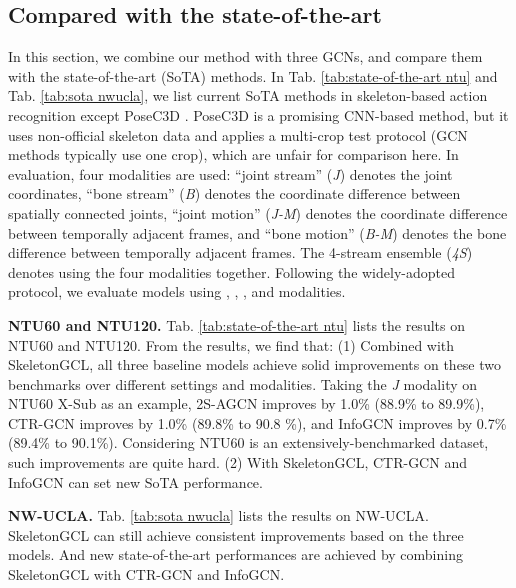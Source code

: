 \documentclass{article} \usepackage{iclr2023_conference,times}
\begin{document}
\subsection{Compared with the state-of-the-art}
In this section, we combine our method with three GCNs, and compare them with the state-of-the-art (SoTA) methods. In Tab. \ref{tab:state-of-the-art ntu} and Tab. \ref{tab:sota nwucla}, we list current SoTA methods in skeleton-based action recognition except PoseC3D \citep{posec3d}. PoseC3D is a promising CNN-based method, but it uses non-official skeleton data and applies a multi-crop test protocol (GCN methods typically use one crop), which are unfair for comparison here. In evaluation, four modalities are used: ``joint stream'' (\textit{J}) denotes the joint coordinates, ``bone stream'' (\textit{B}) denotes the coordinate difference between spatially connected joints, ``joint motion'' (\textit{J-M}) denotes the coordinate difference between temporally adjacent frames, and ``bone motion'' (\textit{B-M}) denotes the bone difference between temporally adjacent frames. The 4-stream ensemble (\textit{4S}) denotes using the four modalities together. 
Following the widely-adopted protocol, we evaluate models using , , , and  modalities.

\noindent \textbf{NTU60 and NTU120.} Tab. \ref{tab:state-of-the-art ntu} lists the results on NTU60 and NTU120. From the results, we find that: (1) Combined with SkeletonGCL, all three baseline models achieve solid improvements on these two benchmarks over different settings and modalities. Taking the \textit{J} modality on NTU60 X-Sub as an example, 2S-AGCN improves by 1.0\% (88.9\% to 89.9\%), CTR-GCN improves by 1.0\% (89.8\% to 90.8 \%), and InfoGCN improves by 0.7\% (89.4\% to 90.1\%). Considering NTU60 is an extensively-benchmarked dataset, such improvements are quite hard. (2) With SkeletonGCL, CTR-GCN and InfoGCN can set new SoTA performance.

\noindent \textbf{NW-UCLA.} Tab. \ref{tab:sota nwucla} lists the results on NW-UCLA. SkeletonGCL can still achieve consistent improvements based on the three models. And new state-of-the-art performances are achieved by combining SkeletonGCL with CTR-GCN and InfoGCN.
\end{document}
